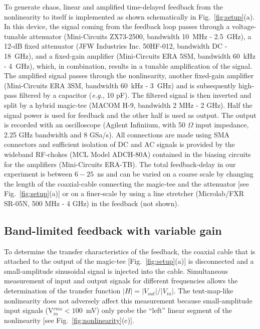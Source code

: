 \documentclass[aps,twocolumn,pre,nofootinbib]{revtex4}
\begin{document}
To generate chaos, linear and amplified time-delayed feedback from the nonlinearity to itself is implemented as shown schematically in Fig.~\ref{fig:setup}(a). 
In this device, the signal coming from the feedback loop passes through a voltage-tunable attenuator (Mini-Circuits ZX73-2500, bandwidth 10~MHz - 2.5~GHz), a 12-dB fixed attenuator (JFW Industries Inc. 50HF-012, bandwidth DC - 18~GHz), and a fixed-gain amplifier (Mini-Circuits ERA 5SM, bandwidth 60~kHz - 4~GHz), which, in combination, results in a tunable amplification of the signal.
 The amplified signal passes through the nonlinearity, another fixed-gain amplifier (Mini-Circuits ERA 3SM, bandwidth 60~kHz - 3~GHz) and is subsequently high-pass filtered by a capacitor ({\it e.g.}, 10 pF). 
The filtered signal is then inverted and split by a hybrid magic-tee (MACOM H-9, bandwidth 2 MHz - 2 GHz). Half the signal power is used for feedback and the other half is used as output. The output is recorded with an oscilloscope (Agilent Infiniium, with 50 $\Omega$ input impedance, 2.25 GHz bandwidth and 8 GSa/s).
All connections are made using SMA connectors and sufficient isolation of DC and AC signals is provided by the wideband RF-chokes (MCL Model ADCH-80A) contained in the biasing circuits for the amplifiers (Mini-Circuits ERA-TB).
%
The total feedback-delay in our experiment is between $6 - 25$~ns and can be varied on a coarse scale by changing the length of the coaxial-cable connecting the magic-tee and the attenuator [see Fig.~\ref{fig:setup}(a)] or on a finer-scale by using a line stretcher (Microlab/FXR SR-05N, 500 MHz - 4 GHz) in the feedback (not shown).



\subsection{Band-limited feedback with variable gain}

To determine the transfer characteristics of the feedback, the coaxial cable that is attached to the output of the magic-tee [Fig.~\ref{fig:setup}(a)] is disconnected and a small-amplitude sinusoidal signal is injected into the cable. Simultaneous measurement of input and output signals for different frequencies allows the determination of the transfer function $|H|=|V_{out}|/| V_{in}|$. The tent-map-like nonlinearity does not adversely affect this measurement because small-amplitude input signals (V$_{in}^{rms}< 100$~mV) only probe the ``left'' linear segment of the nonlinearity [see Fig.~\ref{fig:nonlinearity}(c)].
\end{document}
